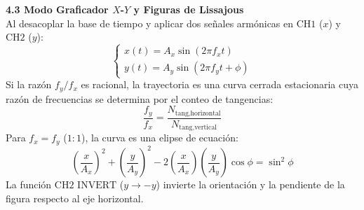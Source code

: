 \documentclass[a4paper, 11pt]{article}
\begin{document}
\begin{tcolorbox}[title=Texto a Escribir: Sección 4 (Continuación), colframe=black]
    \textbf{4.3 Modo Graficador $X$-$Y$ y Figuras de Lissajous}\\[0.1cm]
    Al desacoplar la base de tiempo y aplicar dos señales armónicas en $\text{CH1}$ ($x$) y $\text{CH2}$ ($y$):
    \begin{equation}
        \begin{cases}
            x(t) = A_x \sin(2\pi f_x t) \\
            y(t) = A_y \sin(2\pi f_y t + \phi)
        \end{cases} \tag{10}
    \end{equation}
    Si la razón $f_y/f_x$ es racional, la trayectoria es una curva cerrada estacionaria cuya razón de frecuencias se determina por el conteo de tangencias:
    \begin{equation}
        \frac{f_y}{f_x} = \frac{N_{\text{tang,horizontal}}}{N_{\text{tang,vertical}}} \tag{11}
    \end{equation}
    Para $f_x = f_y$ ($1:1$), la curva es una elipse de ecuación:
    \begin{equation*}
        \left(\frac{x}{A_x}\right)^2 + \left(\frac{y}{A_y}\right)^2 - 2\left(\frac{x}{A_x}\right)\left(\frac{y}{A_y}\right)\cos\phi = \sin^2\phi
    \end{equation*}
    La función $\text{CH2 INVERT}$ ($y \to -y$) invierte la orientación y la pendiente de la figura respecto al eje horizontal.
\end{tcolorbox}

\newpage

\end{document}
